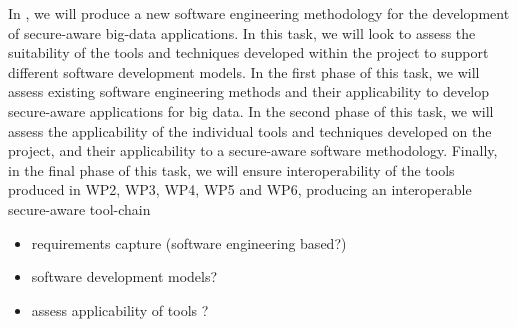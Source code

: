 \begin{Workpackage}{\thewpno}
\begin{Task}
	In \theTask, we will produce a new software engineering methodology for the development of secure-aware big-data applications. In this task, we will look to assess the suitability of the tools and techniques developed within the project to support different software development models. 
	In the first phase of this task, we will assess existing  software engineering methods and their applicability to develop secure-aware applications for big data.
	In the second phase of this task, we will assess the applicability of the individual tools and techniques developed on the \TheProject{} project, and their applicability to a secure-aware software methodology. 
	Finally, in the final phase of this task, we will ensure interoperability of the tools produced in WP2, WP3, WP4, WP5 and WP6, producing an interoperable secure-aware tool-chain
	\begin{itemize}
		\item requirements capture (software engineering based?)
		\item software development models?
		\item assess applicability of tools ?
	\end{itemize}
\end{Task}


%	
%	



\end{Workpackage}
